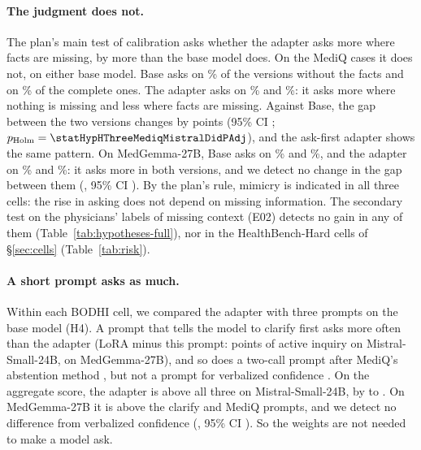 \documentclass{article}
\newcommand{\bodhi}{BODHI}
\newcommand{\hbhard}{HealthBench-Hard}
\begin{document}
\paragraph{The judgment does not.} The plan's main test of calibration asks whether the adapter
asks more where facts are missing, by more than the base model does. On the MediQ cases it does
not, on either base model. Base asks on
\statMediqMistralActiveInquiryIncompletePosRateBase\% of the versions without the facts and on
\statMediqMistralActiveInquiryIncompleteNegRateBase\% of the complete ones. The adapter asks on
\statMediqMistralActiveInquiryIncompletePosRateLoRA\% and
\statMediqMistralActiveInquiryIncompleteNegRateLoRA\%: it asks more where nothing is missing and
less where facts are missing. Against Base, the gap between the two versions changes by
\statHypHThreeMediqMistralDidDiff{} points (95\% CI \statHypHThreeMediqMistralDidCI;
$p_{\text{Holm}} = \statHypHThreeMediqMistralDidPAdj$), and the ask-first adapter shows the same
pattern. On MedGemma-27B, Base asks on \statMediqMedGemmaCapActiveInquiryIncompletePosRateBase\% and
\statMediqMedGemmaCapActiveInquiryIncompleteNegRateBase\%, and the adapter on
\statMediqMedGemmaCapActiveInquiryIncompletePosRateLoRA\% and
\statMediqMedGemmaCapActiveInquiryIncompleteNegRateLoRA\%: it asks more in both versions, and we
detect no change in the gap between them (\statHypHThreeMediqMedGemmaCapDidDiff, 95\% CI
\statHypHThreeMediqMedGemmaCapDidCI). By the plan's rule, mimicry is indicated in all three cells:
the rise in asking does not depend on missing information. The secondary test on the physicians'
labels of missing context (E02) detects no gain in any of them (Table~\ref{tab:hypotheses-full}),
nor in the \hbhard{} cells of \S\ref{sec:cells} (Table~\ref{tab:risk}).

\paragraph{A short prompt asks as much.} Within each \bodhi{} cell, we compared the adapter
with three prompts on the base model (H4). A prompt that tells the model to clarify first asks
more often than the adapter (LoRA minus this prompt:
\statHypHFourHBMistralBaseClarifyActiveInquiryDiff{} points of active inquiry on Mistral-Small-24B,
\statHypHFourHBMedGemmaCapBaseClarifyActiveInquiryDiff{} on MedGemma-27B), and so does a
two-call prompt after MediQ's abstention method \citep{li2024mediq}, but not a prompt for verbalized
confidence \citep{tian2023just}. On the aggregate score, the adapter is above all three on
Mistral-Small-24B, by \statHypHFourHBMistralBaseVerbalizedConfidenceRubricScoreDiff{} to
\statHypHFourHBMistralBaseMediqAbstainRubricScoreDiff. On MedGemma-27B it is above the clarify and
MediQ prompts, and we detect no difference from verbalized confidence
(\statHypHFourHBMedGemmaCapBaseVerbalizedConfidenceRubricScoreDiff, 95\% CI
\statHypHFourHBMedGemmaCapBaseVerbalizedConfidenceRubricScoreCI). So the weights are not needed to
make a model ask.
\end{document}

